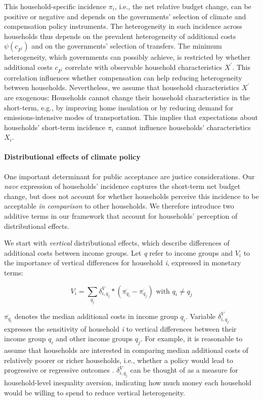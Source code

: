 \documentclass[12pt, a4paper]{article}
\begin{document}
This household-specific incidence $\pi_{i}$, i.e., the net relative budget change, can be positive or negative and depends on the governments' selection of climate and compensation policy instruments. The heterogeneity in such incidence across households thus depends on the prevalent heterogeneity of additional costs $\psi(c_{P^{\prime}})$ and on the governments' selection of transfers. The minimum heterogeneity, which governments can possibly achieve, is restricted by whether additional costs $c_{P^{\prime}}$ correlate with observable household characteristics $X^{\prime}$. This correlation influences whether compensation can help reducing heterogeneity between households. Nevertheless, we assume that household characteristics $X^{\prime}$ are exogenous: Households cannot change their household characteristics in the short-term, e.g., by improving home insulation or by reducing demand for emissions-intensive modes of transportation. This implies that expectations about households' short-term incidence $\pi_{i}$ cannot influence households' characteristics $X_{i}$.

\paragraph{Distributional effects of climate policy}
One important determinant for public acceptance are justice considerations. Our \textit{nave} expression of households' incidence captures the short-term net budget change, but does not account for whether households perceive this incidence to be acceptable \textit{in comparison} to other households. We therefore introduce two additive terms in our framework that account for households' perception of distributional effects. 

We start with \textit{vertical} distributional effects, which describe differences of additional costs between income groups. Let \textit{q} refer to income groups and $V_{i}$ to the importance of vertical differences for household \textit{i}, expressed in monetary terms:

\begin{equation}\label{eq_V}
    V_{i} = \sum_{q_{j}} \delta_{i,q_{j}}^{V} * (\overline{\pi_{q_{i}}}-\overline{\pi_{q_{j}}}) \text{ with } q_{i} \neq q_{j}  
\end{equation}

$\overline{\pi_{q_{i}}}$ denotes the median additional costs in income group $q_{i}$. Variable $\delta_{i,q_{j}}^{V}$ expresses the sensitivity of household \textit{i} to vertical differences between their income group $q_{i}$ and other income groups $q_{j}$. For example, it is reasonable to assume that households are interested in comparing median additional costs of relatively poorer or richer households, i.e., whether a policy would lead to progressive or regressive outcomes \autocite[e.g.,][]{Dechezlepretre.2022}. $\delta_{i,q_{j}}^{V}$ can be thought of as a measure for household-level inequality aversion, indicating how much money each household would be willing to spend to reduce vertical heterogeneity.
\end{document}
